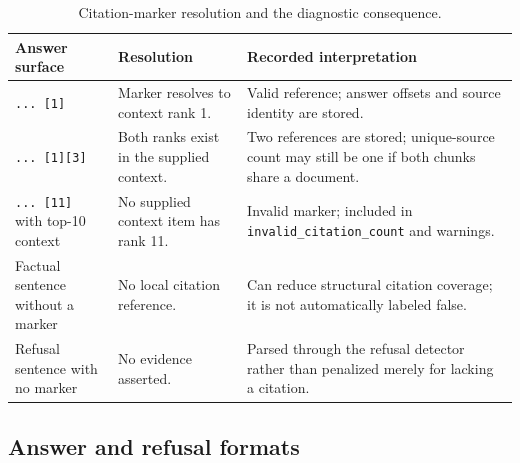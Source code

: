 \begin{table}[t]
\centering
\scriptsize
\caption{Citation-marker resolution and the diagnostic consequence.}
\label{tab:appendix-citation-resolution}
\begin{tabular}{p{}p{}p{}}
\toprule
\textbf{Answer surface} & \textbf{Resolution} & \textbf{Recorded interpretation} \\
\midrule
\texttt{... [1]} & Marker resolves to context rank 1. & Valid reference; answer offsets and source identity are stored. \\
\texttt{... [1][3]} & Both ranks exist in the supplied context. & Two references are stored; unique-source count may still be one if both chunks share a document. \\
\texttt{... [11]} with top-10 context & No supplied context item has rank 11. & Invalid marker; included in \texttt{invalid\_citation\_count} and warnings. \\
Factual sentence without a marker & No local citation reference. & Can reduce structural citation coverage; it is not automatically labeled false. \\
Refusal sentence with no marker & No evidence asserted. & Parsed through the refusal detector rather than penalized merely for lacking a citation. \\
\bottomrule
\end{tabular}
\end{table}

\subsection{Answer and refusal formats}

